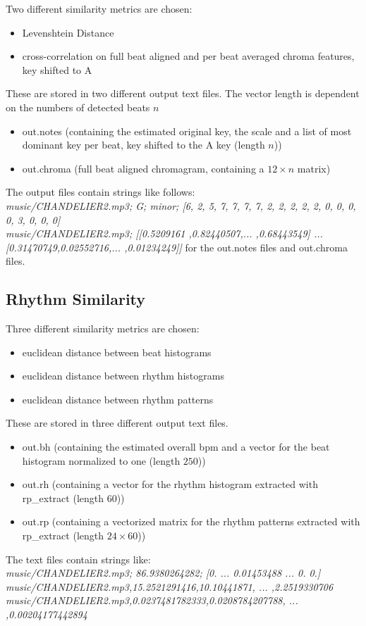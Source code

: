 Two different similarity metrics are chosen: 
\begin{itemize}
	\item Levenshtein Distance
	\item cross-correlation on full beat aligned and per beat averaged chroma features, key shifted to A
\end{itemize}
These are stored in two different output text files. The vector length is dependent on the numbers of detected beats $n$
\begin{itemize}
	\item out.notes (containing the estimated original key, the scale and a list of most dominant key per beat, key shifted to the A key (length $n$))
	\item out.chroma (full beat aligned chromagram, containing a $12 \times n$ matrix)
\end{itemize}
The output files contain strings like follows:\\
\textit{music/CHANDELIER2.mp3; G; minor; [6, 2, 5, 7, 7, 7, 7, 2, 2, 2, 2, 2, 0, 0, 0, 0, 3, 0, 0, 0]}\\
\textit{music/CHANDELIER2.mp3; [[0.5209161 ,0.82440507,... ,0.68443549] ... [0.31470749,0.02552716,... ,0.01234249]]}
for the out.notes files and out.chroma files. 

\subsection{Rhythm Similarity}

Three different similarity metrics are chosen: 
\begin{itemize}
	\item euclidean distance between beat histograms
	\item euclidean distance between rhythm histograms
	\item euclidean distance between rhythm patterns
\end{itemize}
These are stored in three different output text files.
\begin{itemize}
	\item out.bh (containing the estimated overall bpm and a vector for the beat histogram normalized to one (length $250$))
	\item out.rh (containing a vector for the rhythm histogram extracted with rp\_extract (length $60$))
	\item out.rp (containing a vectorized matrix for the rhythm patterns extracted with rp\_extract (length $24 \times 60$))
\end{itemize}
The text files contain strings like:\\
\textit{music/CHANDELIER2.mp3; 86.9380264282; [0. ... 0.01453488 ...  0.  0.]}\\
\textit{music/CHANDELIER2.mp3,15.2521291416,10.10441871, ... ,2.2519330706}\\
\textit{music/CHANDELIER2.mp3,0.0237481782333,0.0208784207788, ... ,0.00204177442894}\\